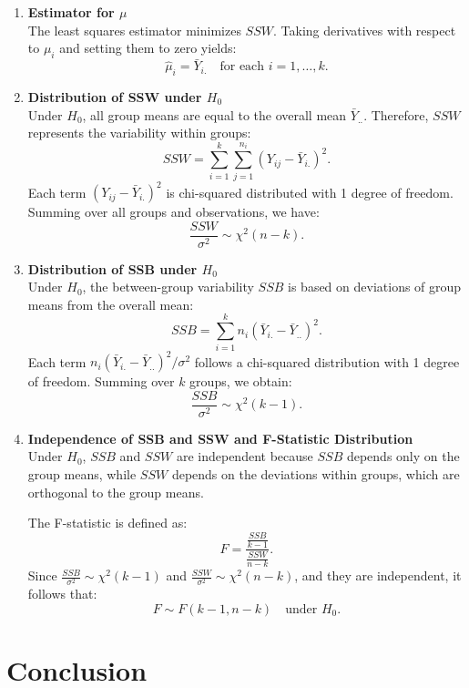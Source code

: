 \documentclass[open=any, 11pt,paper=A4]{scrreprt}
\begin{document}
\begin{enumerate}
    \item \textbf{Estimator for $\mu$} \\
    The least squares estimator minimizes $SSW$. Taking derivatives with respect to $\mu_i$ and setting them to zero yields:
    \[
    \hat{\mu}_i = \bar{Y}_{i.} \quad \text{for each } i = 1, \ldots, k.
    \]
    
    \item \textbf{Distribution of SSW under $H_0$} \\
    Under $H_0$, all group means are equal to the overall mean $\bar{Y}_{..}$. Therefore, $SSW$ represents the variability within groups:
    \[
    SSW = \sum_{i=1}^k \sum_{j=1}^{n_i} (Y_{ij} - \bar{Y}_{i.})^2.
    \]
    Each term $(Y_{ij} - \bar{Y}_{i.})^2$ is chi-squared distributed with 1 degree of freedom. Summing over all groups and observations, we have:
    \[
    \frac{SSW}{\sigma^2} \sim \chi^2(n - k).
    \]
    
    \item \textbf{Distribution of SSB under $H_0$} \\
    Under $H_0$, the between-group variability $SSB$ is based on deviations of group means from the overall mean:
    \[
    SSB = \sum_{i=1}^k n_i (\bar{Y}_{i.} - \bar{Y}_{..})^2.
    \]
    Each term $n_i (\bar{Y}_{i.} - \bar{Y}_{..})^2 / \sigma^2$ follows a chi-squared distribution with 1 degree of freedom. Summing over $k$ groups, we obtain:
    \[
    \frac{SSB}{\sigma^2} \sim \chi^2(k - 1).
    \]
    
    \item \textbf{Independence of SSB and SSW and F-Statistic Distribution} \\
    Under $H_0$, $SSB$ and $SSW$ are independent because $SSB$ depends only on the group means, while $SSW$ depends on the deviations within groups, which are orthogonal to the group means.
    
    The F-statistic is defined as:
    \[
    F = \frac{\frac{SSB}{k - 1}}{\frac{SSW}{n - k}}.
    \]
    Since $\frac{SSB}{\sigma^2} \sim \chi^2(k - 1)$ and $\frac{SSW}{\sigma^2} \sim \chi^2(n - k)$, and they are independent, it follows that:
    \[
    F \sim F(k - 1, n - k) \quad \text{under } H_0.
    \]
\end{enumerate}

\section{Conclusion}
\end{document}
